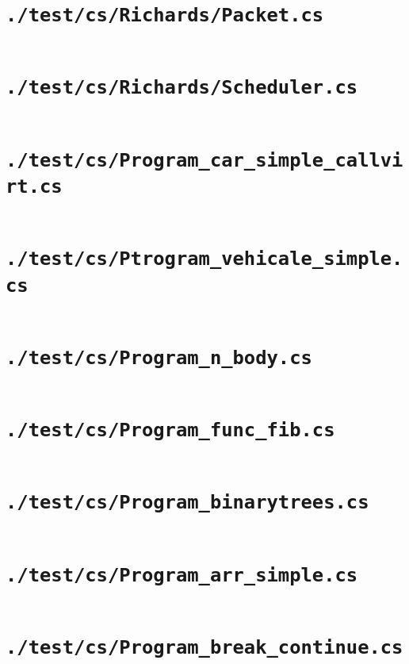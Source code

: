 \documentclass[a4paper, 11pt]{report}
\begin{document}
    \section{\lstinline{./test/cs/Richards/Packet.cs}}
    \inputminted{csharp}{./test/cs/Richards/Packet.cs}


    \section{\lstinline{./test/cs/Richards/Scheduler.cs}}
    \inputminted{csharp}{./test/cs/Richards/Scheduler.cs}


    \section{\lstinline{./test/cs/Program_car_simple_callvirt.cs}}
    \inputminted{csharp}{./test/cs/Program_car_simple_callvirt.cs}


    \section{\lstinline{./test/cs/Ptrogram_vehicale_simple.cs}}
    \inputminted{csharp}{./test/cs/Ptrogram_vehicale_simple.cs}


    \section{\lstinline{./test/cs/Program_n_body.cs}}
    \inputminted{csharp}{./test/cs/Program_n_body.cs}


    \section{\lstinline{./test/cs/Program_func_fib.cs}}
    \inputminted{csharp}{./test/cs/Program_func_fib.cs}


    \section{\lstinline{./test/cs/Program_binarytrees.cs}}
    \inputminted{csharp}{./test/cs/Program_binarytrees.cs}


    \section{\lstinline{./test/cs/Program_arr_simple.cs}}
    \inputminted{csharp}{./test/cs/Program_arr_simple.cs}


    \section{\lstinline{./test/cs/Program_break_continue.cs}}
    \inputminted{csharp}{./test/cs/Program_break_continue.cs}
\end{document}
